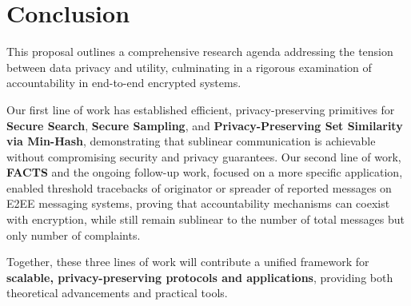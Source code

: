 \section{Conclusion}

This proposal outlines a comprehensive research agenda addressing the tension between data privacy and utility, culminating in a rigorous examination of accountability in end-to-end encrypted systems.

Our first line of work has established efficient, privacy-preserving primitives for \textbf{Secure Search}, \textbf{Secure Sampling}, and \textbf{Privacy-Preserving Set Similarity via Min-Hash}, demonstrating that sublinear communication is achievable without compromising security and privacy guarantees. Our second line of work, \textbf{FACTS} and the ongoing follow-up work, focused on a more specific application, enabled threshold tracebacks of originator or spreader of reported messages on E2EE messaging systems, proving that accountability mechanisms can coexist with encryption, while still remain sublinear to the number of total messages but only number of complaints.

Together, these three lines of work will contribute a unified framework for \textbf{scalable, privacy-preserving protocols and applications}, providing both theoretical advancements and practical tools.